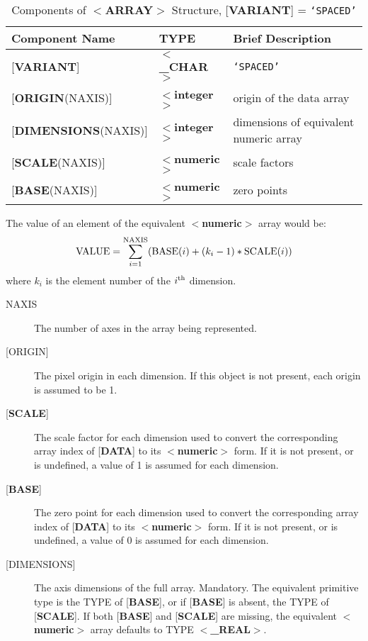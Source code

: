 \documentclass[twoside,11pt]{article}
\begin{document}
\begin{table}[htb]
\centering
\caption{Components of $<${\bf ARRAY}$>$ Structure,
{[}{\bf VARIANT}{]} = {\tt `SPACED'}}
\begin{tabular}{|l|l|l|}
\hline
Component Name & TYPE & Brief Description \\  \hline
{[}{\bf VARIANT}{]} & $<${\bf \_CHAR}$>$ & {\tt `SPACED'} \\
{[}{\bf ORIGIN}(NAXIS){]} & $<${\bf integer}$>$ & origin of the data array \\
{[}{\bf DIMENSIONS}(NAXIS){]} & $<${\bf integer}$>$ & dimensions of equivalent numeric array\\
{[}{\bf SCALE}(NAXIS){]} & $<${\bf numeric}$>$ & scale factors \\
{[}{\bf BASE}(NAXIS){]} & $<${\bf numeric}$>$ & zero points \\ \hline
\end{tabular}
\end{table}

The value of an element of the equivalent
$<${\bf numeric}$>$ array would be:
\[{\rm VALUE} = \sum_{i=1}^{\rm NAXIS} ({\rm BASE}(i) + (k_i-1) * {\rm SCALE}(i) ) \]
where $k_i$ is the element number of the $i^{\rm th}$ dimension.
\begin{description}
\item [NAXIS]
The number of axes in the array being represented.
\item [{[}ORIGIN{]}]
The pixel origin in each dimension.  If this object is not present,
each origin is assumed to be 1. 
\item [{[}{\bf SCALE}{]}]
The scale factor for each dimension used to convert the corresponding
array index of {[}{\bf DATA}{]} to its
$<${\bf numeric}$>$ form.  If it is not present, or is undefined,
a value of 1 is assumed for each dimension.
\item [{[}{\bf BASE}{]}]
The zero point for each dimension used to convert the corresponding
array index of {[}{\bf DATA}{]} to its
$<${\bf numeric}$>$ form.  If it is not present, or is undefined, a value of 0
is assumed for each dimension.
\item [{[}DIMENSIONS{]}]
The axis dimensions of the full array.  Mandatory.
The equivalent primitive type
is the TYPE of {[}{\bf BASE}{]}, or if {[}{\bf BASE}{]} is
absent, the TYPE of {[}{\bf SCALE}{]}.  If both
{[}{\bf BASE}{]} and {[}{\bf SCALE}{]} are missing, the
equivalent $<${\bf numeric}$>$ array defaults to
TYPE $<${\bf \_REAL}$>$.
\end{description}
\end{document}
